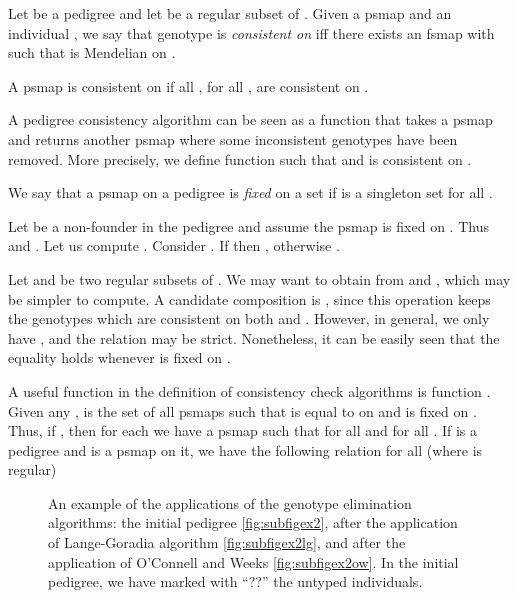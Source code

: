 \begin{definition}
  Let  be a pedigree and let  be a regular subset of .
Given a psmap  and an individual , we say that
genotype  is {\em consistent on } if{}f there exists
an fsmap  with  such that  is Mendelian on .

A psmap  is consistent on  if all , for all , are consistent on .
\end{definition}

A pedigree consistency algorithm can be seen as a function that takes a psmap
and returns another psmap where some inconsistent genotypes have been removed.
More precisely, we define function  such that
 and  is consistent on .

We say that a psmap  on a pedigree  is {\em fixed} on a set 
if  is a singleton set for all .
\begin{example}
  \label{ex:filter-on-nuclear-family}
Let  be a non-founder 
in the pedigree  and assume the psmap  
is fixed on . Thus  and .
Let us compute . 
Consider . If  then ,
otherwise .
\end{example}

Let  and  be two regular subsets of . 
We may want to obtain 
from  and , which may be simpler to compute.
A candidate composition is , since this operation
keeps the genotypes which are consistent on both  and .
However, in general, we only have
,
and the relation may be strict.
Nonetheless, it can be easily seen that the
equality holds whenever 
 is fixed on .

A useful function in the definition
of consistency check algorithms is function .
Given any ,  is the set of all psmaps 
such that  is equal to 
on  and is fixed on .
Thus, if , then
for each 
we have a psmap  such that  for all 
and  for all .
If  is a pedigree and  is a psmap on it,
we have the following relation for all  (where  is regular)


\begin{figure}
  \centering
  \caption{An example of the applications of the genotype elimination
    algorithms: the initial pedigree \ref{fig:subfigex2}, after the application
    of Lange-Goradia algorithm \ref{fig:subfigex2lg}, and after the application
    of O'Connell and Weeks \ref{fig:subfigex2ow}. In the initial pedigree, we
    have marked with ``??'' the untyped individuals.}
  \label{fig:example2}
\end{figure}






